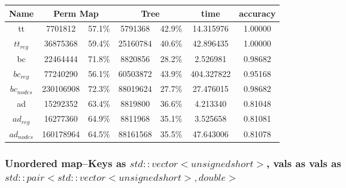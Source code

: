 \documentclass[]{article}
\begin{document}
\begin{center}
\begin{tabular} { |c|c|c|c|c|c|c| }
\hline
Name & \multicolumn{2}{c|}{Perm Map} & \multicolumn{2}{c|}{Tree} & time & accuracy \\
\hline

tt & 7701812 & 57.1\%  & 5791368 & 42.9\% & 14.315976 & 1.00000 \\

$tt_{reg}$ & 36875368 & 59.4\% & 25160784 & 40.6\% & 42.896435 & 1.00000 \\

bc & 22464444 & 71.8\% & 8820856 & 28.2\% & 2.526981 & 0.98682 \\

$bc_{reg}$ & 77240290 & 56.1\% & 60503872 & 43.9\% & 404.327822 & 0.95168 \\

$bc_{nodes}$ & 230106908 & 72.3\% & 88019624 & 27.7\% & 27.476015 & 0.98682 \\

ad & 15292352 & 63.4\% & 8819800 & 36.6\% & 4.213340 & 0.81048 \\

$ad_{reg}$ & 16277360 & 64.9\% & 8811968 & 35.1\% & 3.525658 & 0.81081 \\

$ad_{nodes}$ & 160178964 & 64.5\% & 88161568 & 35.5\% & 47.643006 & 0.81078 \\
\hline
\end{tabular}
\end{center}

\subsubsection{Unordered map--Keys as $std::vector<unsigned short>$, vals as vals as $std::pair<std::vector<unsigned short>, double>$}
\end{document}
